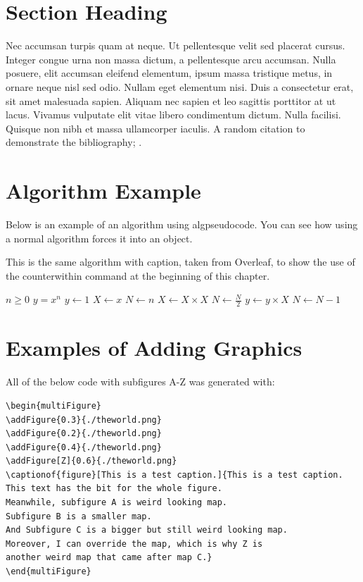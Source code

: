 \section{Section Heading}
Nec accumsan turpis quam at neque. Ut pellentesque velit sed placerat cursus. Integer congue urna non massa dictum, a pellentesque arcu accumsan. Nulla posuere, elit accumsan eleifend elementum, ipsum massa tristique metus, in ornare neque nisl sed odio. Nullam eget elementum nisi. Duis a consectetur erat, sit amet malesuada sapien. Aliquam nec sapien et leo sagittis porttitor at ut lacus. Vivamus vulputate elit vitae libero condimentum dictum. Nulla facilisi. Quisque non nibh et massa ullamcorper iaculis. A random citation to demonstrate the bibliography; \cite{ConwayCSV1}.

\section{Algorithm Example}
Below is an example of an algorithm using algpseudocode. You can see how using a normal algorithm forces it into an object. 
\begin{algorithm}
\caption{This is the same algorithm with caption, taken from Overleaf, to show the use of the counterwithin command at the beginning of this chapter.}\label{alg:cap2}
\begin{algorithmic}
\Require $n \geq 0$
\Ensure $y = x^n$
\State $y \gets 1$
\State $X \gets x$
\State $N \gets n$
    \State $X \gets X \times X$
    \State $N \gets \frac{N}{2}$  
    \State $y \gets y \times X$
    \State $N \gets N - 1$
\EndIf
\EndWhile
\end{algorithmic}
\end{algorithm}


\section{Examples of Adding Graphics}
\label{Sec:addingGraphics}
All of the below code with subfigures A-Z was generated with:
\begin{verbatim}
\begin{multiFigure}
\addFigure{0.3}{./theworld.png}
\addFigure{0.2}{./theworld.png}
\addFigure{0.4}{./theworld.png}
\addFigure[Z]{0.6}{./theworld.png}
\captionof{figure}[This is a test caption.]{This is a test caption. 
This text has the bit for the whole figure. 
Meanwhile, subfigure A is weird looking map. 
Subfigure B is a smaller map. 
And Subfigure C is a bigger but still weird looking map. 
Moreover, I can override the map, which is why Z is 
another weird map that came after map C.}
\end{multiFigure}
\end{verbatim}

